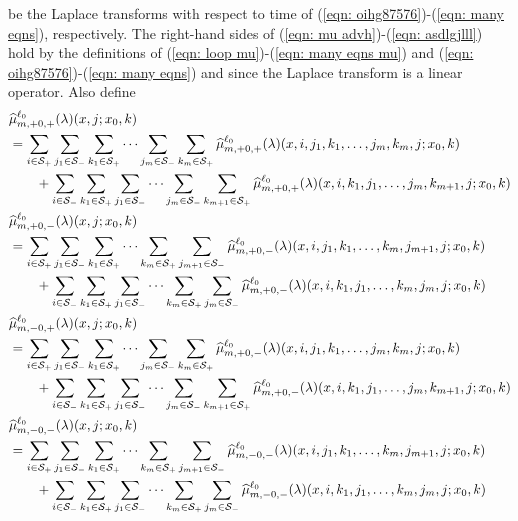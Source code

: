 be the Laplace transforms with respect to time of (\ref{eqn: oihg87576})-(\ref{eqn: many eqns}), respectively. The right-hand sides of (\ref{eqn: mu advh})-(\ref{eqn: asdlgjlll}) hold by the definitions of (\ref{eqn: loop mu})-(\ref{eqn: many eqns mu}) and (\ref{eqn: oihg87576})-(\ref{eqn: many eqns}) and since the Laplace transform is a linear operator. Also define 
\begin{align}
	\nonumber&\widehat \mu_{m,+0,+}^{\ell_0}(\lambda)( x,j;x_0,k) 
	\\&= \sum_{i\in\mathcal{S}_+}\sum_{j_1\in\mathcal S_-} \sum_{k_1\in\mathcal S_+}\dots \sum_{j_m\in\mathcal S_-}\sum_{k_m\in\mathcal S_+}\widehat  \mu_{m,+0,+}^{\ell_0}(\lambda)( x,i,j_1,k_1,\dots,j_m,k_m, j; x_0,k)  \nonumber 
	\\&\qquad {} + \sum_{i\in\mathcal{S}_-}\sum_{k_1\in\mathcal S_+}\sum_{j_1\in\mathcal S_-} \dots \sum_{j_m\in\mathcal S_-}\sum_{k_{m+1}\in\mathcal S_+}\widehat  \mu_{m,+0,+}^{\ell_0}(\lambda)( x,i,k_1,j_1,\dots,j_m,k_{m+1}, j; x_0,k)  \label{eqn: mu advh2}
	\\\nonumber&\widehat \mu_{m,+0,-}^{\ell_0}(\lambda)( x,j;x_0,k) 
	\\&= \sum_{i\in\mathcal{S}_+}\sum_{j_1\in\mathcal S_-} \sum_{k_1\in\mathcal S_+}\dots \sum_{k_m\in\mathcal S_+}\sum_{j_{m+1}\in\mathcal S_-}\widehat  \mu_{m,+0,-}^{\ell_0}(\lambda)( x,i,j_1,k_1,\dots,k_m,j_{m+1}, j; x_0,k)  \nonumber 
	\\&\qquad {} + \sum_{i\in\mathcal{S}_-}\sum_{k_1\in\mathcal S_+}\sum_{j_1\in\mathcal S_-} \dots\sum_{k_{m}\in\mathcal S_+} \sum_{j_m\in\mathcal S_-}\widehat  \mu_{m,+0,-}^{\ell_0}(\lambda)( x,i,k_1,j_1,\dots,k_{m},j_m, j; x_0,k)
	\\\nonumber&\widehat \mu_{m,-0,+}^{\ell_0}(\lambda)( x,j;x_0,k) 
	\\&= \sum_{i\in\mathcal{S}_+}\sum_{j_1\in\mathcal S_-} \sum_{k_1\in\mathcal S_+}\dots\sum_{j_{m}\in\mathcal S_-} \sum_{k_m\in\mathcal S_+}\widehat  \mu_{m,+0,-}^{\ell_0}(\lambda)( x,i,j_1,k_1,\dots,j_{m},k_m, j; x_0,k)  \nonumber 
	\\&\qquad {} + \sum_{i\in\mathcal{S}_-}\sum_{k_1\in\mathcal S_+}\sum_{j_1\in\mathcal S_-} \dots \sum_{j_m\in\mathcal S_-}\sum_{k_{m+1}\in\mathcal S_+}\widehat  \mu_{m,+0,-}^{\ell_0}(\lambda)( x,i,k_1,j_1,\dots,j_{m},k_{m+1}, j; x_0,k)
	\\\nonumber&\widehat \mu_{m,-0,-}^{\ell_0}(\lambda)( x,j;x_0,k) 
	\\&= \sum_{i\in\mathcal{S}_+}\sum_{j_1\in\mathcal S_-} \sum_{k_1\in\mathcal S_+}\dots \sum_{k_m\in\mathcal S_+}\sum_{j_{m+1}\in\mathcal S_-}\widehat  \mu_{m,-0,-}^{\ell_0}(\lambda)( x,i,j_1,k_1,\dots,k_m,j_{m+1}, j; x_0,k)  \nonumber 
	\\&\qquad {} + \sum_{i\in\mathcal{S}_-}\sum_{k_1\in\mathcal S_+}\sum_{j_1\in\mathcal S_-} \dots \sum_{k_{m}\in\mathcal S_+}\sum_{j_m\in\mathcal S_-}\widehat  \mu_{m,-0,-}^{\ell_0}(\lambda)( x,i,k_1,j_1,\dots,k_{m},j_m, j; x_0,k) 
\end{align}
